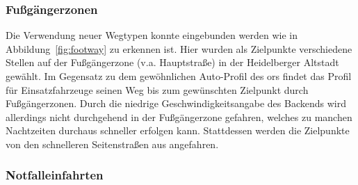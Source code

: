 \subsubsection{Fußgängerzonen}

Die Verwendung neuer Wegtypen konnte eingebunden werden wie in Abbildung~\ref{fig:footway} zu erkennen ist.
Hier wurden als Zielpunkte verschiedene Stellen auf der Fußgängerzone (v.a. Hauptstraße) in der Heidelberger Altstadt gewählt.
Im Gegensatz zu dem gewöhnlichen Auto-Profil des \gls{ors} findet das Profil für Einsatzfahrzeuge seinen Weg bis zum gewünschten Zielpunkt durch Fußgängerzonen.
Durch die niedrige Geschwindigkeitsangabe des Backends wird allerdings nicht durchgehend in der Fußgängerzone gefahren, welches zu manchen Nachtzeiten durchaus schneller erfolgen kann.
Stattdessen werden die Zielpunkte von den schnelleren Seitenstraßen aus angefahren.


\subsubsection{Notfalleinfahrten}

